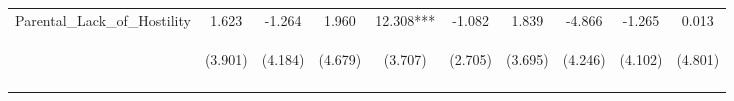 \begin{tabular}{lccccccccc}
\noalign{\smallskip}Parental_Lack_of_Hostility & 1.623 & -1.264 & 1.960 & 12.308*** & -1.082 & 1.839 & -4.866 & -1.265 & 0.013\\
 & \begin{footnotesize}(3.901)\end{footnotesize} & \begin{footnotesize}(4.184)\end{footnotesize} & \begin{footnotesize}(4.679)\end{footnotesize} & \begin{footnotesize}(3.707)\end{footnotesize} & \begin{footnotesize}(2.705)\end{footnotesize} & \begin{footnotesize}(3.695)\end{footnotesize} & \begin{footnotesize}(4.246)\end{footnotesize} & \begin{footnotesize}(4.102)\end{footnotesize} & \begin{footnotesize}(4.801)\end{footnotesize}\\
\noalign{\smallskip}\hline\end{tabular}\\
